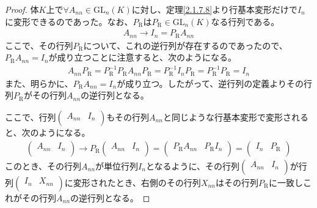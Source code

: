 \documentclass[dvipdfmx]{jsarticle}
\begin{document}
\begin{proof}
体$K$上で$\forall A_{nn} \in {\mathrm{GL}}_{n}(K)$に対し、定理\ref{2.1.7.8}より行基本変形だけで$I_{n}$に変形できるのであった。なお、$P_{\mathrm{R}}$は$P_{\mathrm{R}} \in {\mathrm{GL}}_{n}(K)$なる行列である。
\begin{align*}
A_{nn} \rightarrow I_{n} = P_{\mathrm{R}}A_{nn}
\end{align*}
ここで、その行列$P_{\mathrm{R}}$について、これの逆行列が存在するのであったので、$P_{\mathrm{R}}A_{nn} = I_{n}$が成り立つことに注意すると、次のようになる。
\begin{align*}
A_{nn}P_{\mathrm{R}} = P_{\mathrm{R}}^{- 1}P_{\mathrm{R}}A_{nn}P_{\mathrm{R}} = P_{\mathrm{R}}^{- 1}I_{n}P_{\mathrm{R}} = P_{\mathrm{R}}^{- 1}P_{\mathrm{R}} = I_{n}
\end{align*}
また、明らかに、$P_{\mathrm{R}}A_{nn} = I_{n}$が成り立つ。したがって、逆行列の定義よりその行列$P_{\mathrm{R}}$がその行列$A_{nn}$の逆行列となる。\par
ここで、行列$\begin{pmatrix}
A_{nn} & I_{n} \\
\end{pmatrix}$もその行列$A_{nn}$と同じような行基本変形で変形されると、次のようになる。
\begin{align*}
\begin{pmatrix}
A_{nn} & I_{n} \\
\end{pmatrix} \rightarrow P_{\mathrm{R}}\begin{pmatrix}
A_{nn} & I_{n} \\
\end{pmatrix} = \begin{pmatrix}
P_{\mathrm{R}}A_{nn} & P_{\mathrm{R}}I_{n} \\
\end{pmatrix} = \begin{pmatrix}
I_{n} & P_{\mathrm{R}} \\
\end{pmatrix}
\end{align*}
このとき、その行列$A_{nn}$が単位行列$I_{n}$となるように、その行列$\begin{pmatrix}
A_{nn} & I_{n} \\
\end{pmatrix}$が行列$\begin{pmatrix}
I_{n} & X_{nn} \\
\end{pmatrix}$に変形されたとき、右側のその行列$X_{nn}$はその行列$P_{\mathrm{R}}$に一致しこれがその行列$A_{nn}$の逆行列となる。
\end{proof}
\end{document}
